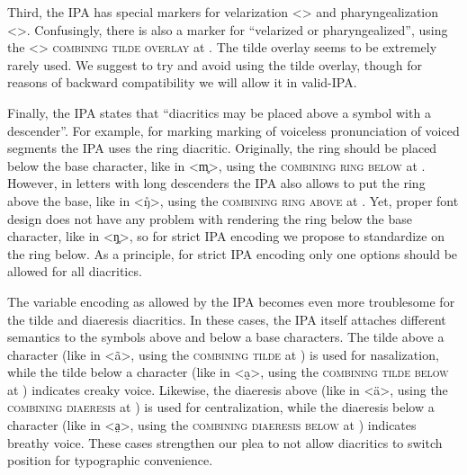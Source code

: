 Third, the IPA has special markers for velarization <> and
pharyngealization <>. Confusingly, there is also a marker for
``velarized or pharyngealized'', using the <> \textsc{combining tilde
overlay} at . The tilde overlay seems to be extremely rarely used. We 
suggest to try and avoid using the tilde overlay, though for reasons of backward 
compatibility we will allow it in valid-IPA.\@

Finally, the IPA states that ``diacritics may be placed above a symbol with a
descender''. For example, for marking marking of voiceless pronunciation of
voiced segments the IPA uses the ring diacritic. Originally, the ring should be
placed below the base character, like in <m̥>, using the \textsc{combining ring
below} at . However, in letters with long descenders the IPA also
allows to put the ring above the base, like in <ŋ̊>, using the \textsc{combining
ring above} at . Yet, proper font design does not have any problem
with rendering the ring below the base character, like in <ŋ̥>, so for strict
IPA encoding we propose to standardize on the ring below. As a principle, for
strict IPA encoding only one options should be allowed for all diacritics.

The variable encoding as allowed by the IPA becomes even more troublesome for
the tilde and diaeresis diacritics. In these cases, the IPA itself attaches
different semantics to the symbols above and below a base characters. The tilde
above a character (like in <ã>, using the \textsc{combining tilde} at
) is used for nasalization, while the tilde below a character (like in
<a̰>, using the \textsc{combining tilde below} at ) indicates creaky
voice. Likewise, the diaeresis above (like in <ä>, using the \textsc{combining
diaeresis} at ) is used for centralization, while the diaeresis below
a character (like in <a̤>, using the \textsc{combining diaeresis below} at
) indicates breathy voice. These cases strengthen our plea to not
allow diacritics to switch position for typographic convenience.



